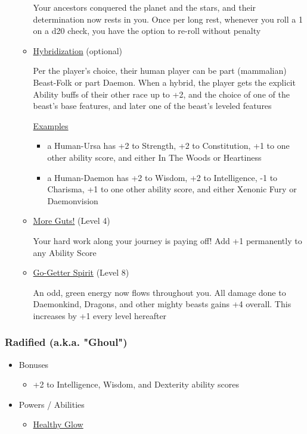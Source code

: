 \documentclass[12pt, landscape]{article}
\begin{document}
\begin{FlushLeft}
\begin{multicols}{2}
\begin{itemize}
\begin{itemize}
					Your ancestors conquered the planet and the stars, and their determination now rests in you. Once per long rest, whenever you roll a 1 on a d20 check, you have the option to re-roll without penalty

					\item \underline{Hybridization} (optional)

					Per the player’s choice, their human player can be part (mammalian) Beast-Folk or part Daemon. When a hybrid, the player gets the explicit Ability buffs of their other race up to +2, and the choice of one of the beast’s base features, and later one of the beast’s leveled features

					\underline{Examples}
					\begin{itemize}
						\item a Human-Ursa has +2 to Strength, +2 to Constitution, +1 to one other ability score, and either In The Woods or Heartiness
						\item a Human-Daemon has +2 to Wisdom, +2 to Intelligence, -1 to Charisma, +1 to one other ability score, and either Xenonic Fury or Daemonvision
					\end{itemize}

					\item \underline{More Guts!} (Level 4)

					Your hard work along your journey is paying off! Add +1 permanently to any Ability Score
					\vfill \null \columnbreak

					\item \underline{Go-Getter Spirit} (Level 8)

					An odd, green energy now flows throughout you. All damage done to Daemonkind, Dragons, and other mighty beasts gains +4 overall. This increases by +1 every level hereafter
				\end{itemize}
			\end{itemize}

			\subsubsection{Radified (a.k.a. "Ghoul")}
			\begin{itemize}
				\item Bonuses
				\begin{itemize}
					\item +2 to Intelligence, Wisdom, and Dexterity ability scores
				\end{itemize}
				\item Powers / Abilities
				\begin{itemize}
					\item \underline{Healthy Glow}


\end{itemize}
\end{itemize}
\end{multicols}
\end{FlushLeft}
\end{document}
